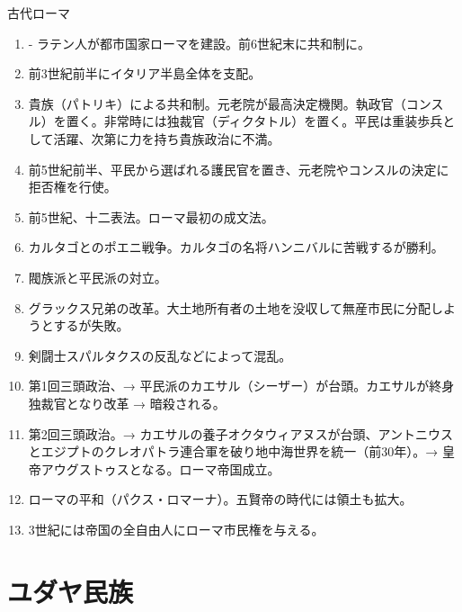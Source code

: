 \documentclass[twocolumn,autodetect-engine,dvipdfmx-if-dvi,ja=standard]{jsarticle} \usepackage{mystyle}
\begin{document}
古代ローマ
\begin{enumerate}
\item - ラテン人が都市国家ローマを建設。前6世紀末に共和制に。
\item 前3世紀前半にイタリア半島全体を支配。
\item 貴族（パトリキ）による共和制。元老院が最高決定機関。執政官（コンスル）を置く。非常時には独裁官（ディクタトル）を置く。平民は重装歩兵として活躍、次第に力を持ち貴族政治に不満。
\item 前5世紀前半、平民から選ばれる護民官を置き、元老院やコンスルの決定に拒否権を行使。
\item 前5世紀、十二表法。ローマ最初の成文法。
\item カルタゴとのポエニ戦争。カルタゴの名将ハンニバルに苦戦するが勝利。
\item 閥族派と平民派の対立。
\item グラックス兄弟の改革。大土地所有者の土地を没収して無産市民に分配しようとするが失敗。
\item 剣闘士スパルタクスの反乱などによって混乱。
\item 第1回三頭政治、→ 平民派のカエサル（シーザー）が台頭。カエサルが終身独裁官となり改革 → 暗殺される。
\item 第2回三頭政治。→ カエサルの養子オクタウィアヌスが台頭、アントニウスとエジプトのクレオパトラ連合軍を破り地中海世界を統一（前30年）。→ 皇帝アウグストゥスとなる。ローマ帝国成立。
\item ローマの平和（パクス・ロマーナ）。五賢帝の時代には領土も拡大。
\item 3世紀には帝国の全自由人にローマ市民権を与える。

\end{enumerate}
\section{ユダヤ民族}
\end{document}
